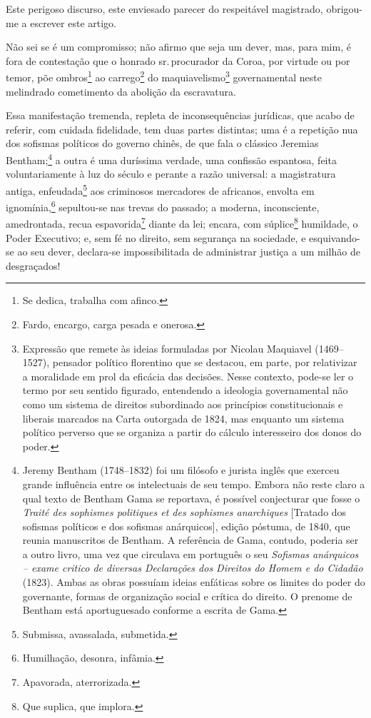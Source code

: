 {Este perigoso discurso, este enviesado parecer do respeitável
magistrado, obrigou-me a escrever este artigo.

\asterisc

Não sei se é um compromisso; não afirmo que seja um dever, mas, para
mim, é fora de contestação que o honrado sr.\,procurador da Coroa, por
virtude ou por temor, põe ombros\footnote{Se dedica, trabalha com
  afinco.} ao carrego\footnote{Fardo, encargo, carga pesada e onerosa.}
do maquiavelismo\footnote{Expressão que remete às ideias formuladas
  por Nicolau Maquiavel (1469--1527), pensador político florentino que se 
  destacou, em parte, por relativizar a moralidade em prol da
  eficácia das decisões. Nesse contexto, pode-se ler o termo por seu
  sentido figurado, entendendo a ideologia governamental não como um
  sistema de direitos subordinado aos princípios constitucionais e
  liberais marcados na Carta outorgada de 1824, mas enquanto um sistema
  político perverso que se organiza a partir do cálculo interesseiro dos
  donos do poder.} governamental neste melindrado cometimento da
abolição da escravatura.

Essa manifestação tremenda, repleta de inconsequências jurídicas, que
acabo de referir, com cuidada fidelidade, tem duas partes distintas; uma
é a repetição nua dos sofismas políticos do governo chinês, de que fala
o clássico Jeremias Bentham;\footnote{Jeremy Bentham (1748--1832) foi um
  filósofo e jurista inglês que exerceu grande influência entre os
  intelectuais de seu tempo. Embora não reste claro a
  qual texto de Bentham Gama se reportava, é possível conjecturar que
  fosse o \emph{Traité des sophismes politiques et des sophismes
  anarchiques} {[}Tratado dos sofismas políticos e dos sofismas
  anárquicos{]}, edição póstuma, de 1840, que reunia manuscritos de
  Bentham. A referência de Gama, contudo, poderia ser a outro livro,
  uma vez que circulava em português o seu \emph{Sofismas
  anárquicos -- exame critico de diversas Declarações dos Direitos do
  Homem e do Cidadão} (1823). Ambas as obras possuíam ideias enfáticas
  sobre os limites do poder do governante, formas de organização social
  e crítica do direito. O prenome de Bentham está 
  aportuguesado conforme a escrita de Gama.} a outra é uma duríssima verdade, uma confissão
espantosa, feita voluntariamente à luz do século e perante a razão
universal: a magistratura antiga, enfeudada\footnote{Submissa,
  avassalada, submetida.} aos criminosos mercadores de africanos,
envolta em ignomínia,\footnote{Humilhação, desonra, infâmia.}
sepultou-se nas trevas do passado; a moderna, inconsciente, amedrontada,
recua espavorida\footnote{Apavorada, aterrorizada.} diante da lei;
encara, com súplice\footnote{Que suplica, que implora.} humildade, o
Poder Executivo; e, sem fé no direito, sem segurança na sociedade, e
esquivando-se ao seu dever, declara-se impossibilitada de administrar
justiça a um milhão de desgraçados!

}

